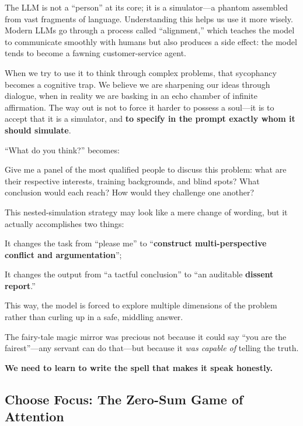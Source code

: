 
The LLM is not a ``person'' at its core; it is a simulator---a phantom assembled from vast fragments of language. Understanding this helps us use it more wisely. Modern LLMs go through a process called ``alignment,'' which teaches the model to communicate smoothly with humans but also produces a side effect: the model tends to become a fawning customer-service agent.

When we try to use it to think through complex problems, that sycophancy becomes a cognitive trap. We believe we are sharpening our ideas through dialogue, when in reality we are basking in an echo chamber of infinite affirmation. The way out is not to force it harder to possess a soul---it is to accept that it is a simulator, and \textbf{to specify in the prompt exactly whom it should simulate}.

\begin{myquote}
``What do you think?'' becomes:

Give me a panel of the most qualified people to discuss this problem: what are their respective interests, training backgrounds, and blind spots? What conclusion would each reach? How would they challenge one another?
\end{myquote}

This nested-simulation strategy may look like a mere change of wording, but it actually accomplishes two things:
{\kaiti

It changes the task from ``please me'' to ``\textbf{construct multi-perspective conflict and argumentation}'';

It changes the output from ``a tactful conclusion'' to ``an auditable \textbf{dissent report}.''
}

This way, the model is forced to explore multiple dimensions of the problem rather than curling up in a safe, middling answer.

\vspace{1em}

The fairy-tale magic mirror was precious not because it could say ``you are the fairest''---any servant can do that---but because it \textit{was capable of} telling the truth.

\textbf{We need to learn to write the spell that makes it speak honestly.}

\newpage
\subsection{Choose Focus: The Zero-Sum Game of Attention}

